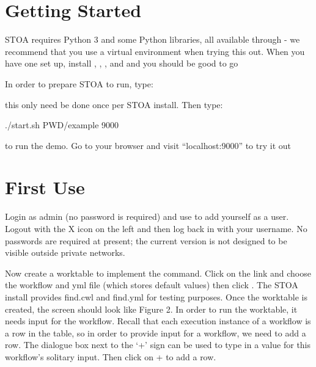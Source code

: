\documentclass[letterpaper,10pt,english]{sphinxmanual}
\begin{document}
\section{Getting Started}
\label{\detokenize{starting:getting-started}}
STOA requires Python 3 and some Python libraries, all available through  - we recommend that you use a virtual environment when trying this out.
When you have one set up, install , , ,  and  and you should be good to go

In order to prepare STOA to run, type:

\begin{sphinxVerbatim}[commandchars=\\\{\}]
\end{sphinxVerbatim}

this only need be done once per STOA install. Then type:

\begin{sphinxVerbatim}[commandchars=\\\{\}]
./start.sh \PYGZdl{}PWD/example 9000
\end{sphinxVerbatim}

to run the demo. Go to your browser and visit “localhost:9000” to try it out


\section{First Use}
\label{\detokenize{starting:first-use}}
Login as admin (no password is required) and use  to add yourself as a user. Logout with the X icon on the left and then log back in with your username. No passwords are required at present; the current version is not designed to be visible outside private networks.

\noindent{}

Now create a worktable to implement the  command. Click on the  link and choose the workflow and yml file (which stores default values) then click . The STOA install provides find.cwl and find.yml for testing purposes. Once the worktable is created, the screen should look like Figure 2. In order to run the worktable, it needs input for the workflow. Recall that each execution instance of a workflow is a row in the table, so in order to provide input for a workflow, we need to add a row. The dialogue box next to the ‘+’ sign can be used to type in a value for this workflow’s solitary input. Then click on + to add a row.
\end{document}
